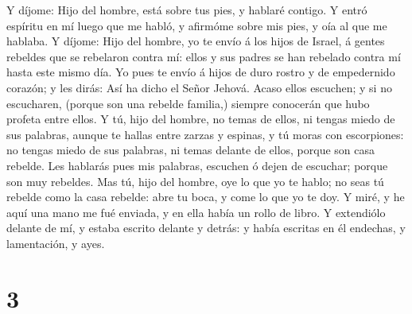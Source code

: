  Y díjome: Hijo del hombre, está sobre tus pies, y hablaré
contigo.  Y entró espíritu en mí luego que me habló, y
afirmóme sobre mis pies, y oía al que me hablaba.  Y
díjome: Hijo del hombre, yo te envío á los hijos de Israel, á gentes
rebeldes que se rebelaron contra mí: ellos y sus padres se han rebelado
contra mí hasta este mismo día.  Yo pues te envío á hijos
de duro rostro y de empedernido corazón; y les dirás: Así ha dicho el
Señor Jehová.  Acaso ellos escuchen; y si no escucharen,
(porque son una rebelde familia,) siempre conocerán que hubo profeta
entre ellos.  Y tú, hijo del hombre, no temas de ellos, ni
tengas miedo de sus palabras, aunque te hallas entre zarzas y espinas, y
tú moras con escorpiones: no tengas miedo de sus palabras, ni temas
delante de ellos, porque son casa rebelde.  Les hablarás
pues mis palabras, escuchen ó dejen de escuchar; porque son muy
rebeldes.  Mas tú, hijo del hombre, oye lo que yo te
hablo; no seas tú rebelde como la casa rebelde: abre tu boca, y come lo
que yo te doy.  Y miré, y he aquí una mano me fué enviada,
y en ella había un rollo de libro.  Y extendiólo delante
de mí, y estaba escrito delante y detrás: y había escritas en él
endechas, y lamentación, y ayes.

\hypertarget{section-2}{%
\section{3}\label{section-2}}

